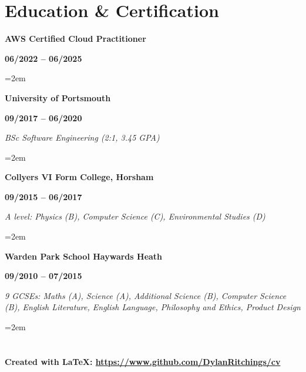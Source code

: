 \documentclass[12pt]{article}
\newcommand{\education}[4]{

  \noindent  \textbf{#1}
    \hfill 
    \parbox{9em}{%
    \centering\textbf{#2}} \par
    \vspace*{0.5em} 
     \noindent \textit{#3} \par
     \vspace*{1em}
     \noindent\hangindent=2em\hangafter=0 \small #4 
\normalsize \par}
\begin{document}
\section*{Education \& Certification}

\education{AWS Certified Cloud Practitioner} {06/2022 -- 06/2025} {} {}
\education{University of Portsmouth} {09/2017 -- 06/2020} {BSc Software Engineering (2:1, 3.45 GPA)} {}
\education{Collyers VI Form College, Horsham} {09/2015 -- 06/2017} {A level: Physics (B), Computer Science (C), Environmental Studies (D)} {}
\education{Warden Park School Haywards Heath} {09/2010 -- 07/2015} {9 GCSEs: Maths (A), Science (A), Additional Science (B), Computer Science (B), English Literature, English Language, Philosophy and Ethics, Product Design} {}

\section*{}
\paragraph {Created with \LaTeX: \url{https://www.github.com/DylanRitchings/cv}}
\end{document}
